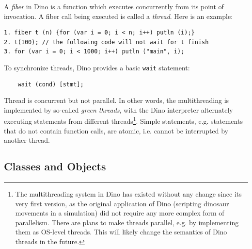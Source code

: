 \documentclass[preprint]{sigplanconf}
\begin{document}
A \emph{fiber} in Dino is a function which executes concurrently from
its point of invocation.  A fiber call being executed is called a
\emph{thread}.  Here is an example:

{\footnotesize
\begin{verbatim}
1. fiber t (n) {for (var i = 0; i < n; i++) putln (i);}
2. t(100); // the following code will not wait for t finish
3. for (var i = 0; i < 1000; i++) putln ("main", i);
\end{verbatim}
}

To synchronize threads, Dino provides a basic {\tt wait} statement:

{\footnotesize
\begin{verbatim}
    wait (cond) [stmt];
\end{verbatim}
}

Thread is concurrent but not parallel. In other words, the multithreading
is implemented by so-called \emph{green threads}, with the Dino interpreter alternately executing statements from different threads\footnote{The multithreading system in Dino
has existed without any change since its very first version,
as the original application of Dino (scripting dinosaur movements in a simulation)
did not require any more complex form of parallelism.
There are plans
to make threads parallel, e.g. by implementing them as OS-level threads.
This will likely change the semantics of Dino threads in the future.}.
Simple statements, e.g. statements that do not contain function calls, are atomic, i.e. cannot be interrupted by another thread.

\subsection{Classes and Objects}
\end{document}
